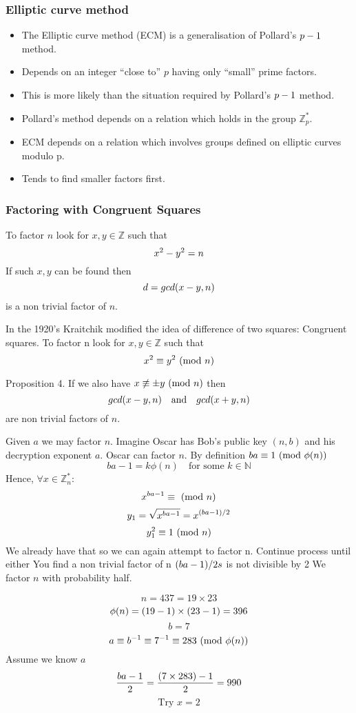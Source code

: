 \subsubsection{Elliptic curve method}
\begin{itemize}
    \item The Elliptic curve method (ECM) is a generalisation of Pollard’s $p - 1$ method.
    \item Depends on an integer “close to” $p$ having only “small” prime factors.
    \item This is more likely than the situation required by Pollard’s $p - 1$ method.
    \item Pollard’s method depends on a relation which holds in the group $\mathbb{Z}^*_p$.
    \item ECM depends on a relation which involves groups defined on elliptic curves modulo p.
    \item Tends to find smaller factors first.
\end{itemize}

\subsubsection{Factoring with Congruent Squares}
To factor $n$ look for $x,y \in \mathbb{Z}$ such that
$$x^2 - y^2 = n$$
If such $x, y$ can be found then 
$$d = gcd(x - y, n)$$
is a non trivial factor of $n$.

In the 1920’s Kraitchik modified the idea of difference of two squares: Congruent squares.
To factor n look for $x,y \in \mathbb{Z}$ such that
$$x^2 \equiv y^2 \ (\mathrm{mod}\ n)$$

Proposition 4.
If we also have $x\not\equiv \pm y \ (\mathrm{mod}\ n)$ then
$$gcd(x - y, n) \quad\textrm{and}\quad gcd(x + y, n)$$
are non trivial factors of $n$.

Given $a$ we may factor $n$.
Imagine Oscar has Bob’s public key $(n, b)$ and his decryption exponent $a$.
Oscar can factor $n$.
By definition $ba \equiv 1 \ (\mathrm{mod}\ \phi(n))$
$$ba - 1 = k\phi(n)\quad\textrm{for some } k \in \mathbb{N}$$
Hence, $\forall x \in \mathbb{Z}_n^*$:
$$x^{ba - 1} \equiv \ (\mathrm{mod}\ n)$$
$$y_1 = \sqrt{x^{ba - 1}} = x^{(ba-1)/2}$$
$$y_1^2 \equiv 1 \ (\mathrm{mod}\ n)$$
We already have that
so we can again attempt to factor n.
Continue process until either
You find a non trivial factor of n
$(ba - 1)/2s$ is not divisible by 2
We factor $n$ with probability half.

\begin{example}
    $$n = 437 = 19 \times 23$$
    $$\phi(n) = (19-1) \times (23-1) = 396$$
    $$b = 7$$
    $$a \equiv b^{-1} \equiv 7^{-1} \equiv 283 \ (\mathrm{mod}\ \phi(n))$$
    Assume we know $a$
    $$\frac{ba-1}{2} = \frac{(7\times283)-1}{2} = 990$$
    $$\textrm{Try } x = 2$$
\end{example}

